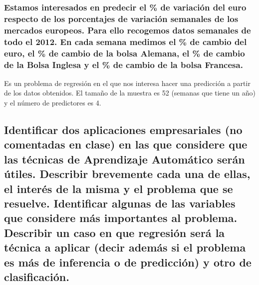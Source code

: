 \subsubsection{Estamos interesados en predecir el \% de variación del euro respecto de los porcentajes de variación semanales de los mercados europeos. Para ello recogemos datos semanales de todo el 2012. En cada semana medimos el \% de cambio del euro, el \% de cambio de la bolsa Alemana, el \% de cambio de la Bolsa Inglesa y el \% de cambio de la bolsa Francesa.}
Es un problema de regresión en el que nos interesa hacer una predicción a partir de los datos obtenidos. El tamaño de la muestra es 52 (semanas que tiene un año) y el número de predictores es 4.


\subsection{Identificar dos aplicaciones empresariales (no comentadas en clase) en las que considere que las técnicas de Aprendizaje Automático serán útiles. Describir brevemente cada una de ellas, el interés de la misma y el problema que se resuelve. Identificar algunas de las variables que considere más importantes al problema. Describir un caso en que regresión será la técnica a aplicar (decir además si el problema es más de inferencia o de predicción) y otro de clasificación.}


